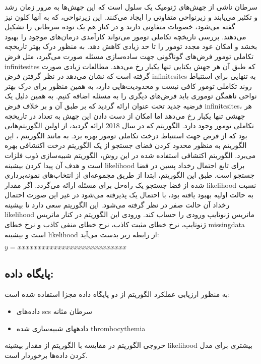 سرطان ناشی از جهش‌های ژنومیک یک سلول است که این جهش‌ها به مرور زمان رشد و تکثیر می‌یابند و زیرنواحی متفاوتی را ایجاد می‌کنند. این زیرنواحی، که به آنها کلون نیز گفته می‌شود، خصویات متفاوتی دارند و در کنار هم یک توده سرطانی را تشکیل می‌دهند. بررسی تاریخچه تکاملی تومور می‌تواند کارآمدی درمان‌های موجود را بهبود بخشد و امکان عود مجدد تومور را تا حد زیادی کاهش دهد. به منظور درک بهتر تاریخچه تکاملی تومور فرض‌های گوناگونی جهت ساده‌سازی مسئله صورت می‌گیرد، مثل فرض \gls{infinitesites} که طبق آن هر جهش یکتایی تنها یکبار رخ می‌دهد. مطالعات زیادی صورت گرفته است که نشان می‌دهد در نظر گرفتن فرض \gls{infinitesites} به تنهایی برای استنباط روند تکاملی تومور کافی نیست و محدودیت‌هایی دارد، به همین منظور برای درک بهتر نواحی ناهمگن توموری باید فرض‌های دیگری را به مسئله اضافه کنیم. به همین دلیل یک فرضیه جدید تحت عنوان  ارائه گردید که بر طبق آن و بر خلاف فرض \gls{infinitesites}، هر جهشی تنها یکبار رخ می‌دهد اما امکان از دست دادن این جهش به تعداد  در تاریخچه تکاملی تومور وجود دارد. الگوریتم  که در سال 2018 ارائه گردید، از اولین الگوریتم‌هایی بود که از فرض  جهت استنباط درخت تکاملی تومور بهره برد. به مانند الگوریتم ، این الگوریتم به منظور محدود کردن فضای جستجو از یک الگوریتم درخت اکتشافی بهره می‌برد. الگوریتم اکتشافی استفاده شده در این روش، الگوریتم شبیه‌سازی ذوب فلزات است و هدف آن پیدا کردن بیشینه \gls{likelihood} برای تابع احتمال رخداد پسین در فضا جستجو است. طبق این الگوریتم، ابتدا از طریق مجموعه‌ای از انتخاب‌های نمونه‌برداری شده از فضا جستجو یک راه‌حل برای مسئله ارائه می‌گردد. اگر مقدار \gls{likelihood} نسبت به حالت اولیه بهبود یافته بود، با احتمال یک پذیرفته می‌شود در غیر این صورت احتمال رخداد آن حالت صفر در نظر گرفته می‌شود. این الگوریتم سعی دارد تا بیشینه \gls{likelihood} ماتریس ژنوتایپ ورودی را حساب کند. ورودی این الگوریتم در کنار ماتریس ژنوتایپ، نرخ خطای مثبت کاذب، نرخ  خطای منفی کاذب و نرخ خطای \gls{missingdata} است و بیشینه \gls{likelihood} از رابطه زیر بدست می‌آید: 

\begin{math}
	y=xxxxxxxxxxxxxxxxxxxxxxxxxxx
\end{math}

\subsection{پایگاه داده: }

به منظور ارزیابی عملکرد الگوریتم  از دو پایگاه داده مجزا استفاده شده است: 
\begin{itemize}
	\item داده‌های \gls{scs} سرطان مثانه
    \item دادههای شبیه‌سازی شده \gls{thrombocythemia} 
\end{itemize}
خروجی الگوریتم در مقایسه با الگوریتم  از مقدار بیشینه \gls{likelihood} بیشتری برای مدل کردن داده‌ها برخوردار است. 


